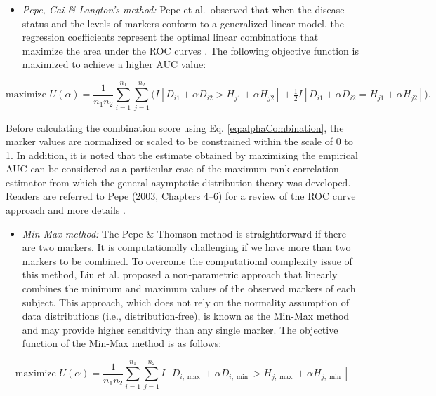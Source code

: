 \begin{itemize}
\tightlist
\item
  \emph{Pepe, Cai \& Langton's method:}
  Pepe et al.~observed that when the disease status and the levels of markers conform to a generalized linear model, the regression coefficients represent the optimal linear combinations that maximize the area under the ROC curves \citep{pepe2006combining}. The following objective function is maximized to achieve a higher AUC value:
\end{itemize}

\begin{equation}
\text{maximize } U(\alpha) = \frac{1}{n_1 n_2} \sum_{i=1}^{n_1} \sum_{j=1}^{n_2} \Big( I[D_{i1} + \alpha D_{i2} > H_{j1} + \alpha H_{j2}] + \tfrac{1}{2} I[D_{i1} + \alpha D_{i2} = H_{j1} + \alpha H_{j2}] \Big).
  \label{eq:maxAlphaUtility}
\end{equation}

Before calculating the combination score using Eq. \eqref{eq:alphaCombination}, the marker values are normalized or scaled to be constrained within the scale of 0 to 1. In addition, it is noted that the estimate obtained by maximizing the empirical AUC can be considered as a particular case of the maximum rank correlation estimator from which the general asymptotic distribution theory was developed. Readers are referred to Pepe (2003, Chapters 4--6) for a review of the ROC curve approach and more details \citep{pepe2003statistical}.

\begin{itemize}
\tightlist
\item
  \emph{Min-Max method:}
  The Pepe \& Thomson method is straightforward if there are two markers. It is computationally challenging if we have more than two markers to be combined. To overcome the computational complexity issue of this method, Liu et al. \citep{liu2011min} proposed a non-parametric approach that linearly combines the minimum and maximum values of the observed markers of each subject. This approach, which does not rely on the normality assumption of data distributions (i.e., distribution-free), is known as the Min-Max method and may provide higher sensitivity than any single marker. The objective function of the Min-Max method is as follows:
\end{itemize}

\begin{equation}
\text{maximize } U(\alpha) = \frac{1}{n_1 n_2} \sum_{i=1}^{n_1} \sum_{j=1}^{n_2} I[D_{i,\max} + \alpha D_{i,\min} > H_{j,\max} + \alpha H_{j,\min}]
  \label{eq:maxMinUtility}
\end{equation}


